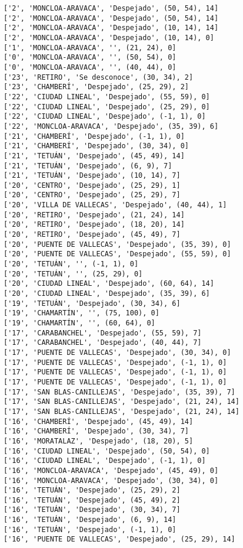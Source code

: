 \documentclass[11pt]{article}
\begin{document}
\begin{Verbatim}[commandchars=\\\{\}]
['2', 'MONCLOA-ARAVACA', 'Despejado', (50, 54), 14]
['2', 'MONCLOA-ARAVACA', 'Despejado', (50, 54), 14]
['2', 'MONCLOA-ARAVACA', 'Despejado', (10, 14), 14]
['2', 'MONCLOA-ARAVACA', 'Despejado', (10, 14), 0]
['1', 'MONCLOA-ARAVACA', '', (21, 24), 0]
['0', 'MONCLOA-ARAVACA', '', (50, 54), 0]
['0', 'MONCLOA-ARAVACA', '', (40, 44), 0]
['23', 'RETIRO', 'Se desconoce', (30, 34), 2]
['23', 'CHAMBERÍ', 'Despejado', (25, 29), 2]
['22', 'CIUDAD LINEAL', 'Despejado', (55, 59), 0]
['22', 'CIUDAD LINEAL', 'Despejado', (25, 29), 0]
['22', 'CIUDAD LINEAL', 'Despejado', (-1, 1), 0]
['22', 'MONCLOA-ARAVACA', 'Despejado', (35, 39), 6]
['21', 'CHAMBERÍ', 'Despejado', (-1, 1), 0]
['21', 'CHAMBERÍ', 'Despejado', (30, 34), 0]
['21', 'TETUÁN', 'Despejado', (45, 49), 14]
['21', 'TETUÁN', 'Despejado', (6, 9), 7]
['21', 'TETUÁN', 'Despejado', (10, 14), 7]
['20', 'CENTRO', 'Despejado', (25, 29), 1]
['20', 'CENTRO', 'Despejado', (25, 29), 7]
['20', 'VILLA DE VALLECAS', 'Despejado', (40, 44), 1]
['20', 'RETIRO', 'Despejado', (21, 24), 14]
['20', 'RETIRO', 'Despejado', (18, 20), 14]
['20', 'RETIRO', 'Despejado', (45, 49), 7]
['20', 'PUENTE DE VALLECAS', 'Despejado', (35, 39), 0]
['20', 'PUENTE DE VALLECAS', 'Despejado', (55, 59), 0]
['20', 'TETUÁN', '', (-1, 1), 0]
['20', 'TETUÁN', '', (25, 29), 0]
['20', 'CIUDAD LINEAL', 'Despejado', (60, 64), 14]
['20', 'CIUDAD LINEAL', 'Despejado', (35, 39), 6]
['19', 'TETUÁN', 'Despejado', (30, 34), 6]
['19', 'CHAMARTÍN', '', (75, 100), 0]
['19', 'CHAMARTÍN', '', (60, 64), 0]
['17', 'CARABANCHEL', 'Despejado', (55, 59), 7]
['17', 'CARABANCHEL', 'Despejado', (40, 44), 7]
['17', 'PUENTE DE VALLECAS', 'Despejado', (30, 34), 0]
['17', 'PUENTE DE VALLECAS', 'Despejado', (-1, 1), 0]
['17', 'PUENTE DE VALLECAS', 'Despejado', (-1, 1), 0]
['17', 'PUENTE DE VALLECAS', 'Despejado', (-1, 1), 0]
['17', 'SAN BLAS-CANILLEJAS', 'Despejado', (35, 39), 7]
['17', 'SAN BLAS-CANILLEJAS', 'Despejado', (21, 24), 14]
['17', 'SAN BLAS-CANILLEJAS', 'Despejado', (21, 24), 14]
['16', 'CHAMBERÍ', 'Despejado', (45, 49), 14]
['16', 'CHAMBERÍ', 'Despejado', (30, 34), 7]
['16', 'MORATALAZ', 'Despejado', (18, 20), 5]
['16', 'CIUDAD LINEAL', 'Despejado', (50, 54), 0]
['16', 'CIUDAD LINEAL', 'Despejado', (-1, 1), 0]
['16', 'MONCLOA-ARAVACA', 'Despejado', (45, 49), 0]
['16', 'MONCLOA-ARAVACA', 'Despejado', (30, 34), 0]
['16', 'TETUÁN', 'Despejado', (25, 29), 2]
['16', 'TETUÁN', 'Despejado', (45, 49), 2]
['16', 'TETUÁN', 'Despejado', (30, 34), 7]
['16', 'TETUÁN', 'Despejado', (6, 9), 14]
['16', 'TETUÁN', 'Despejado', (-1, 1), 0]
['16', 'PUENTE DE VALLECAS', 'Despejado', (25, 29), 14]

\end{Verbatim}
\end{document}
